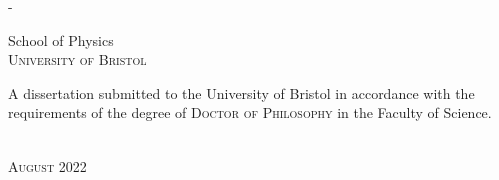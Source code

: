 \begin{titlingpage}
\begin{SingleSpace}
\begin{adjustwidth*}{\unitlength}{-\unitlength}
\begin{center}
\vspace{6mm}
{\large School of Physics\\
\textsc{University of Bristol}}\\
\vspace{11mm}
\begin{minipage}{10cm}
\begin{center}
A dissertation submitted to the University of Bristol in accordance with the requirements of the degree of \textsc{Doctor of Philosophy} in the Faculty of Science.
\end{center}
\end{minipage}\\
\vspace{9mm}
{\large\textsc{August 2022}}
\vspace{12mm}
\end{center}
\end{adjustwidth*}
\end{SingleSpace}
\end{titlingpage}